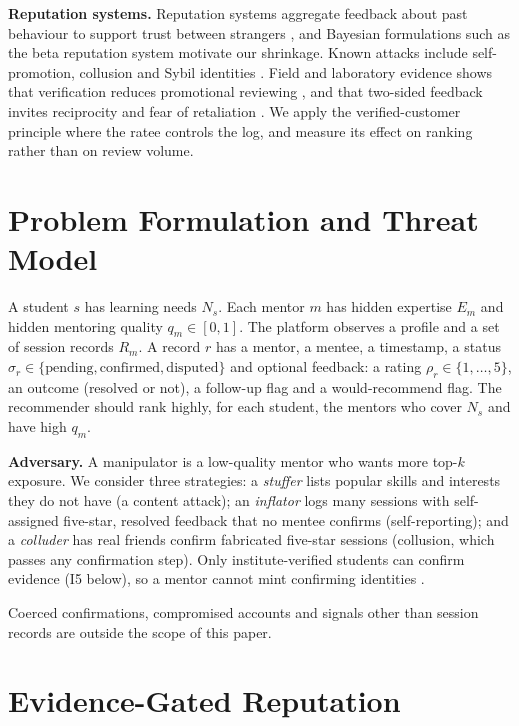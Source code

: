 \documentclass[conference]{IEEEtran}
\begin{document}
\textbf{Reputation systems.} Reputation systems aggregate feedback about past behaviour to support trust between strangers \cite{resnick2000}, and Bayesian formulations such as the beta reputation system \cite{josang2002} motivate our shrinkage. Known attacks include self-promotion, collusion and Sybil identities \cite{hoffman2009,douceur2002,cheng2005}. Field and laboratory evidence shows that verification reduces promotional reviewing \cite{mayzlin2014,kokkodis2022}, and that two-sided feedback invites reciprocity and fear of retaliation \cite{bolton2013,fradkin2021}. We apply the verified-customer principle where the ratee controls the log, and measure its effect on ranking rather than on review volume.

\section{Problem Formulation and Threat Model}
\label{sec:problem}
A student $s$ has learning needs $N_s$. Each mentor $m$ has hidden expertise $E_m$ and hidden mentoring quality $q_m\in[0,1]$. The platform observes a profile and a set of session records $R_m$. A record $r$ has a mentor, a mentee, a timestamp, a status $\sigma_r\in\{\text{pending},\text{confirmed},\text{disputed}\}$ and optional feedback: a rating $\rho_r\in\{1,\dots,5\}$, an outcome (resolved or not), a follow-up flag and a would-recommend flag. The recommender should rank highly, for each student, the mentors who cover $N_s$ and have high $q_m$.

\textbf{Adversary.} A manipulator is a low-quality mentor who wants more top-$k$ exposure. We consider three strategies: a \emph{stuffer} lists popular skills and interests they do not have (a content attack); an \emph{inflator} logs many sessions with self-assigned five-star, resolved feedback that no mentee confirms (self-reporting); and a \emph{colluder} has real friends confirm fabricated five-star sessions (collusion, which passes any confirmation step). Only institute-verified students can confirm evidence (I5 below), so a mentor cannot mint confirming identities \cite{douceur2002}.

Coerced confirmations, compromised accounts and signals other than session records are outside the scope of this paper.

\section{Evidence-Gated Reputation}
\label{sec:method}
\end{document}
